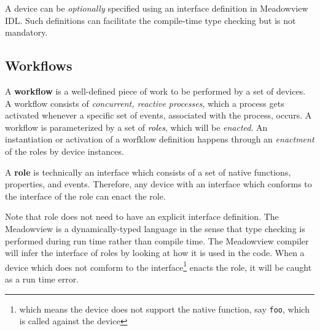 \documentclass{myproc}
\begin{document}
\textcolor{red2}{A device can be {\em optionally\/} specified using an
interface definition in Meadowview IDL.} Such definitions can facilitate the
compile-time type checking but is not mandatory.


\subsection{Workflows}
A \textcolor{blue2}{\bf{}workflow} is a well-defined piece of work to be
performed by a set of devices. A workflow consists of {\em concurrent,
  reactive processes\/}, which 
a process gets activated whenever a specific set of events, associated with
the process, occurs.
A workflow is parameterized by a set of \textcolor{black}{\em{}roles}, which
will be {\em enacted\/}. An instantiation or activation of a worfklow
definition happens through an {\em enactment\/} of the roles by device
instances. 

A \textcolor{blue2}{\bf{}role} is technically an interface which consists of
a set of native functions, properties, and events. Therefore, any device with
an interface which conforms to the interface of the role can enact the role.

\textcolor{red2}{Note that role does not need to have an explicit interface
 definition.} The Meadowview is a dynamically-typed language in the sense that
 type checking is performed during run time rather than compile time. The
 Meadowview compiler will infer the interface of roles by looking at how it is
 used in the code. When a device which does not comform to the
 interface\footnote{which means the device does not support the native function,
   say {\tt foo}, which is called against the device}
 enacts the role, it will be caught as a run time error.
\end{document}
